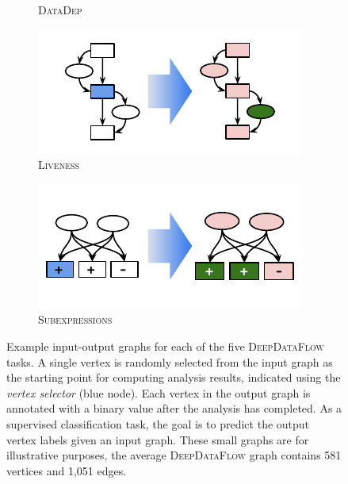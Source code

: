 \begin{figure}
\begin{subfigure}{.19\linewidth}
    \caption{\textsc{DataDep}}
    \label{subfig:dataflow_datadep}
  \end{subfigure}
  \hfill
  \begin{subfigure}{.19\linewidth}
    \includegraphics[width=\linewidth]{images/dataflow/D_liveness}%
    \caption{\textsc{Liveness}}
    \label{subfig:dataflow_liveness}
  \end{subfigure}
  \hfill
  \begin{subfigure}{.21\linewidth}
    \includegraphics[width=.97\linewidth]{images/dataflow/E_subexpressions}%
    \caption{\textsc{Subexpressions}}
    \label{subfig:dataflow_subexpressions}
  \end{subfigure}
  \caption{%
    Example input-output graphs for each of the five \textsc{DeepDataFlow}
    tasks. A single vertex is randomly selected from the input graph as the
    starting point for computing analysis results, indicated using the
    \emph{vertex selector} (blue node). Each vertex in the output graph is
    annotated with a binary value after the analysis has completed. As a
    supervised classification task, the goal is to predict the output vertex
    labels given an input graph. These small graphs are for illustrative
    purposes, the average \textsc{DeepDataFlow} graph contains 581 vertices and
    1,051 edges.%
   }
  \label{fig:dataflow_examples}%
\end{figure}

